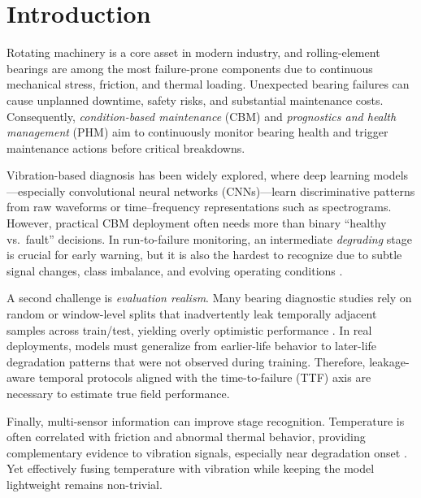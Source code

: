 \section{Introduction}
\label{sec:intro}

Rotating machinery is a core asset in modern industry, and rolling-element bearings are among the most failure-prone components due to continuous mechanical stress, friction, and thermal loading. Unexpected bearing failures can cause unplanned downtime, safety risks, and substantial maintenance costs. Consequently, \emph{condition-based maintenance} (CBM) and \emph{prognostics and health management} (PHM) aim to continuously monitor bearing health and trigger maintenance actions before critical breakdowns.

Vibration-based diagnosis has been widely explored, where deep learning models---especially convolutional neural networks (CNNs)---learn discriminative patterns from raw waveforms or time--frequency representations such as spectrograms. However, practical CBM deployment often needs more than binary ``healthy vs.\ fault'' decisions. In run-to-failure monitoring, an intermediate \emph{degrading} stage is crucial for early warning, but it is also the hardest to recognize due to subtle signal changes, class imbalance, and evolving operating conditions \cite{jung2024dib_rtf}.

A second challenge is \emph{evaluation realism}. Many bearing diagnostic studies rely on random or window-level splits that inadvertently leak temporally adjacent samples across train/test, yielding overly optimistic performance \cite{wheat2024leakage,vieira2024realistic}. In real deployments, models must generalize from earlier-life behavior to later-life degradation patterns that were not observed during training. Therefore, leakage-aware temporal protocols aligned with the time-to-failure (TTF) axis are necessary to estimate true field performance.

Finally, multi-sensor information can improve stage recognition. Temperature is often correlated with friction and abnormal thermal behavior, providing complementary evidence to vibration signals, especially near degradation onset \cite{huang2023esrel_tempvib}. Yet effectively fusing temperature with vibration while keeping the model lightweight remains non-trivial.

